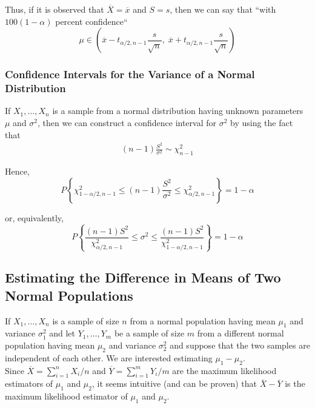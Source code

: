 \documentclass[12pt]{article}
\begin{document}
Thus, if it is observed that $\overline{X} = \overline{x}$ and $S = s$, then we can say that ``with $100(1 - \alpha)$ percent confidence``
\begin{equation*}
  \mu \in \left( \overline{x} - t_{\alpha /2, n-1} \frac{s}{\sqrt{n}}, \;
    \overline{x} + t_{\alpha /2, n-1} \frac{s}{\sqrt{n}} \right)
\end{equation*}

\subsubsection{Confidence Intervals for the Variance of a Normal Distribution}

If $X_1, \dots, X_n$ is a sample from a normal distribution having unknown parameters $\mu$ and $\sigma^2$, then we can construct a confidence interval for $\sigma^2$ by using the fact that
\begin{eqnarray*}
  (n-1) \frac {S^2}{\sigma^2} \sim \chi^2_{n-1}
\end{eqnarray*}

Hence,
\begin{equation*}
  P \left\{ \chi_{1-\alpha / 2, n-1}^2 \le (n-1) \frac {S^2}{\sigma^2}
    \le \chi_{\alpha / 2, n-1}^2 \right\} = 1 - \alpha
\end{equation*}

or, equivalently,
\begin{equation*}
  P \left\{ \frac {(n-1)S^2} {\chi_{\alpha / 2, n-1}^2}
    \le \sigma^2
    \le \frac {(n-1)S^2} {\chi_{1 - \alpha / 2, n-1}^2} \right\}
  = 1 - \alpha
\end{equation*}

\subsection{Estimating the Difference in Means of Two Normal Populations}

If $X_1, \dots, X_n$ is a sample of size $n$ from a normal population having mean $\mu_1$ and variance $\sigma_1^2$ and let $Y_1, \dots, Y_m$ be a sample of size $m$ from a different normal population having mean $\mu_2$ and variance $\sigma_2^2$ and suppose that the two samples are independent of each other. We are interested estimating $\mu_1 - \mu_2$. \\

Since $\overline{X} = \sum_{i=1}^n X_i / n$ and $\overline{Y} = \sum_{i=1}^m Y_i / m$ are the maximum likelihood estimators of $\mu_1$ and $\mu_2$, it seems intuitive (and can be proven) that $\overline{X} - \overline{Y}$ is the maximum likelihood estimator of $\mu_1$ and $\mu_2$. \\
\end{document}
